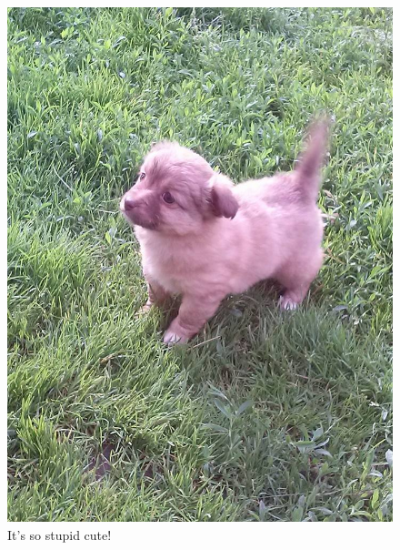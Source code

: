 \documentclass[12pt]{extarticle}
\begin{document}
\begin{figure}[!h]
\centering
  \includegraphics[width={0.4\linewidth}]{img/puppy3.jpg}
  \caption{It's so stupid cute!}
  \label{fig:puppy3}
\end{figure}
\newpage



\end{document}
